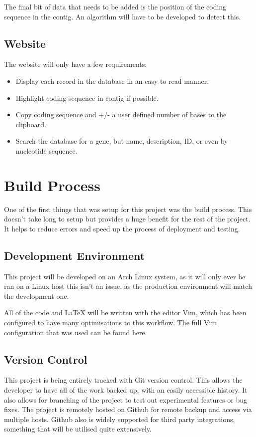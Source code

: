 The final bit of data that needs to be added is the position of the coding sequence in the contig. An algorithm will have to be developed to detect this.

\subsection{Website}
The website will only have a few requirements: 

\begin{itemize}
  \item Display each record in the database in an easy to read manner. 
  \item Highlight coding sequence in contig if possible.
  \item Copy coding sequence and +/- a user defined number of bases to the clipboard.
  \item Search the database for a gene, but name, description, ID, or even by nucleotide sequence. 
\end{itemize}

\section{Build Process}
  One of the first things that was setup for this project was the build process. This doesn't take long to setup but provides a huge benefit for the rest of the project. It helps to reduce errors and speed up the process of deployment and testing.

  \subsection{Development Environment}
    This project will be developed on an Arch Linux system, as it will only ever be ran on a Linux host this isn't an issue, as the production environment will match the development one. 

    All of the code and LaTeX will be written with the editor Vim, which has been configured to have many optimisations to this workflow. The full Vim configuration that was used can be found here\cite{vimrc}.

  \subsection{Version Control}
    This project is being entirely tracked with Git version control. This allows the developer to have all of the work backed up, with an easily accessible history. It also allows for branching of the project to test out experimental features or bug fixes. The project is remotely hosted on Github\cite{github} for remote backup and access via multiple hosts. Github also is widely supported for third party integrations, something that will be utilised quite extensively. 

